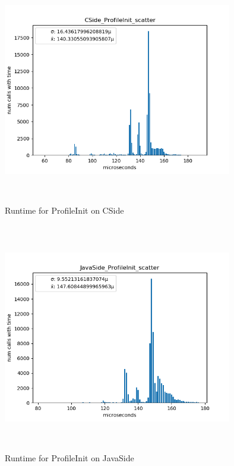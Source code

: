     \begin{figure}[H]
	    \centering
	    \includegraphics[width=10cm,height=10cm,keepaspectratio]{jmh/jni-overhead/CSide_ProfileInit_scatter.png}
	    \caption{Runtime for ProfileInit on CSide}
	    \label{fig:jolteon-jmh-runtime-profileinit-c}
    \end{figure}
    \begin{figure}[H]
	    \centering
	    \includegraphics[width=10cm,height=10cm,keepaspectratio]{jmh/jni-overhead/JavaSide_ProfileInit_scatter.png}
	    \caption{Runtime for ProfileInit on JavaSide}
	    \label{fig:jolteon-jmh-runtime-profileinit-java}
    \end{figure}

